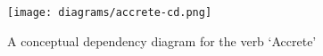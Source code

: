 \documentclass[dissertation.tex]{subfiles}
\begin{document}
    \begin{figure}[h]
        \begin{center}        
            \texttt{[image: diagrams/accrete-cd.png]}
        \end{center}
        \caption{A conceptual dependency diagram for the verb `Accrete'}
    \end{figure}




\end{document}
